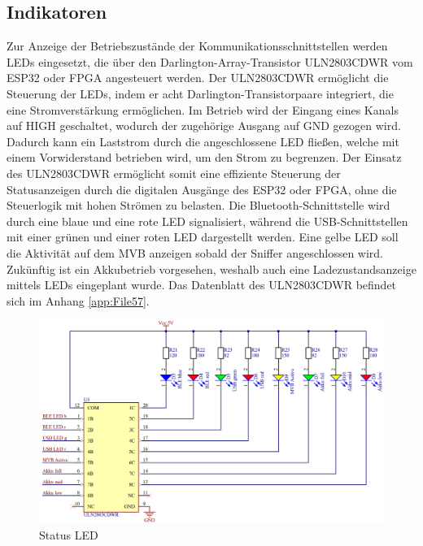 \subsection{Indikatoren}
\label{subsec:Indikatoren}
Zur Anzeige der Betriebszustände der Kommunikationsschnittstellen werden LEDs eingesetzt, die über den Darlington-Array-Transistor ULN2803CDWR vom ESP32 oder FPGA angesteuert werden. Der ULN2803CDWR ermöglicht die Steuerung der LEDs, indem er acht Darlington-Transistorpaare integriert, die eine Stromverstärkung ermöglichen. Im Betrieb wird der Eingang eines Kanals auf HIGH geschaltet, wodurch der zugehörige Ausgang auf GND gezogen wird. Dadurch kann ein Laststrom durch die angeschlossene LED fließen, welche mit einem Vorwiderstand betrieben wird, um den Strom zu begrenzen. Der Einsatz des ULN2803CDWR ermöglicht somit eine effiziente Steuerung der Statusanzeigen durch die digitalen Ausgänge des ESP32 oder FPGA, ohne die Steuerlogik mit hohen Strömen zu belasten. Die Bluetooth-Schnittstelle wird durch eine blaue und eine rote LED signalisiert, während die USB-Schnittstellen mit einer grünen und einer roten LED dargestellt werden. Eine gelbe LED soll die Aktivität auf dem MVB anzeigen sobald der Sniffer angeschlossen wird. Zukünftig ist ein Akkubetrieb vorgesehen, weshalb auch eine Ladezustandsanzeige mittels LEDs eingeplant wurde. 
Das Datenblatt des ULN2803CDWR befindet sich im Anhang \ref{app:File57}.
\begin{figure}
    \centering
    \includegraphics[width=0.9\linewidth]{Figures/Chap3/Schematics/Indicator_LEDs.png}
    \caption{Status LED}
    \label{fig:StateLED}
\end{figure}
